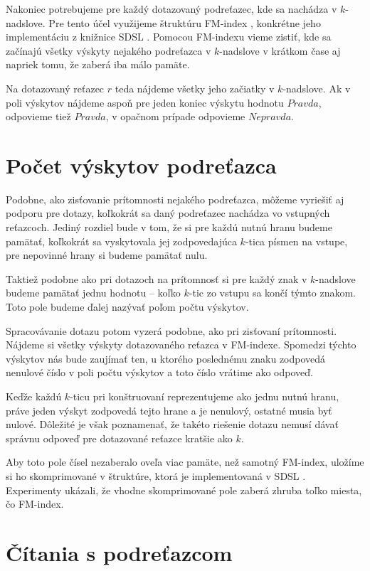 Nakoniec potrebujeme pre každý dotazovaný podreťazec, kde sa nachádza v $k$-nadslove.
Pre tento účel využijeme štruktúru FM-index \cite{fm_index}, konkrétne jeho implementáciu
z knižnice SDSL \cite{sdsl}. Pomocou FM-indexu vieme zistiť, kde sa začínajú všetky
výskyty nejakého podreťazca v $k$-nadslove v krátkom čase aj napriek tomu, že
zaberá iba málo pamäte.

Na dotazovaný reťazec $r$ teda nájdeme všetky jeho začiatky v $k$-nadslove. Ak
v poli výskytov nájdeme aspoň pre jeden koniec výskytu hodnotu $Pravda$, odpovieme
tiež $Pravda$, v opačnom prípade odpovieme $Nepravda$.

\section{Počet výskytov podreťazca}

Podobne, ako zisťovanie prítomnosti nejakého podreťazca, môžeme vyriešiť aj podporu
pre dotazy, koľkokrát sa daný podreťazec nachádza vo vstupných reťazcoch. Jediný rozdiel
bude v tom, že si pre každú nutnú hranu budeme pamätať, koľkokrát sa vyskytovala jej
zodpovedajúca $k$-tica písmen na vstupe, pre nepovinné hrany si budeme pamätať nulu.

Taktiež podobne ako pri dotazoch na prítomnosť si pre každý znak v $k$-nadslove
budeme pamätať jednu hodnotu -- koľko $k$-tic zo vstupu sa končí týmto znakom. Toto
pole budeme ďalej nazývať poľom počtu výskytov.

Spracovávanie dotazu potom vyzerá podobne, ako pri zisťovaní prítomnosti. Nájdeme
si všetky výskyty dotazovaného reťazca v FM-indexe. Spomedzi týchto výskytov nás
bude zaujímať ten, u ktorého poslednému znaku zodpovedá nenulové číslo
v poli počtu výskytov a toto číslo vrátime ako odpoveď. 

Keďže každú $k$-ticu pri konštruovaní
reprezentujeme ako jednu nutnú hranu, práve jeden výskyt zodpovedá tejto hrane a
je nenulový, ostatné musia byť nulové. Dôležité je však poznamenať, že takéto
riešenie dotazu nemusí dávať správnu odpoveď pre dotazované reťazce kratšie ako $k$.

Aby toto pole čísel nezaberalo oveľa viac pamäte, než samotný FM-index, uložíme
si ho skomprimované v štruktúre, ktorá je implementovaná v SDSL \cite{sdsl}.
Experimenty ukázali, že vhodne skomprimované pole zaberá zhruba toľko miesta,
čo FM-index.

\section{Čítania s podreťazcom}

